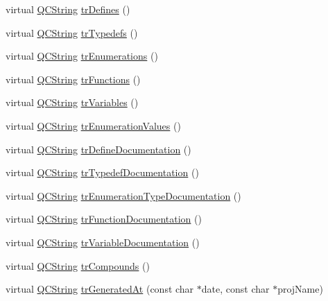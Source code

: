 \begin{DoxyCompactItemize}
\item 
virtual \mbox{\hyperlink{class_q_c_string}{Q\+C\+String}} \mbox{\hyperlink{class_translator_vietnamese_ace7bbd9c6165a19baf08816915bd857b}{tr\+Defines}} ()
\item 
virtual \mbox{\hyperlink{class_q_c_string}{Q\+C\+String}} \mbox{\hyperlink{class_translator_vietnamese_ac45d97b2dd04f64806b47571136d86d5}{tr\+Typedefs}} ()
\item 
virtual \mbox{\hyperlink{class_q_c_string}{Q\+C\+String}} \mbox{\hyperlink{class_translator_vietnamese_ae5e6d592bbe59c3af7acd83bbcfe79a2}{tr\+Enumerations}} ()
\item 
virtual \mbox{\hyperlink{class_q_c_string}{Q\+C\+String}} \mbox{\hyperlink{class_translator_vietnamese_a37bc2e03217110ca185bf2c056b8f62e}{tr\+Functions}} ()
\item 
virtual \mbox{\hyperlink{class_q_c_string}{Q\+C\+String}} \mbox{\hyperlink{class_translator_vietnamese_ae1fc58e63cc9ef429f6641d54adda787}{tr\+Variables}} ()
\item 
virtual \mbox{\hyperlink{class_q_c_string}{Q\+C\+String}} \mbox{\hyperlink{class_translator_vietnamese_ac5be5beab0e1a57f014a0c2f16ad5bb5}{tr\+Enumeration\+Values}} ()
\item 
virtual \mbox{\hyperlink{class_q_c_string}{Q\+C\+String}} \mbox{\hyperlink{class_translator_vietnamese_a84b8a328ace739acc1788f176b27620a}{tr\+Define\+Documentation}} ()
\item 
virtual \mbox{\hyperlink{class_q_c_string}{Q\+C\+String}} \mbox{\hyperlink{class_translator_vietnamese_ad1eaf8ebf07c624c8c5153d00931d424}{tr\+Typedef\+Documentation}} ()
\item 
virtual \mbox{\hyperlink{class_q_c_string}{Q\+C\+String}} \mbox{\hyperlink{class_translator_vietnamese_a20e8429631310f5eb494d7277559a07e}{tr\+Enumeration\+Type\+Documentation}} ()
\item 
virtual \mbox{\hyperlink{class_q_c_string}{Q\+C\+String}} \mbox{\hyperlink{class_translator_vietnamese_a7971993f31cb88a403bc347a6f8b8558}{tr\+Function\+Documentation}} ()
\item 
virtual \mbox{\hyperlink{class_q_c_string}{Q\+C\+String}} \mbox{\hyperlink{class_translator_vietnamese_a0d5dfc1c20351a50c475f4de8b25782c}{tr\+Variable\+Documentation}} ()
\item 
virtual \mbox{\hyperlink{class_q_c_string}{Q\+C\+String}} \mbox{\hyperlink{class_translator_vietnamese_a98bce7410085eef608ea0d7ae8fb1442}{tr\+Compounds}} ()
\item 
virtual \mbox{\hyperlink{class_q_c_string}{Q\+C\+String}} \mbox{\hyperlink{class_translator_vietnamese_a0a75e47a72f6df8dd802cb6e96b72b54}{tr\+Generated\+At}} (const char $\ast$date, const char $\ast$proj\+Name)

\end{DoxyCompactItemize}
